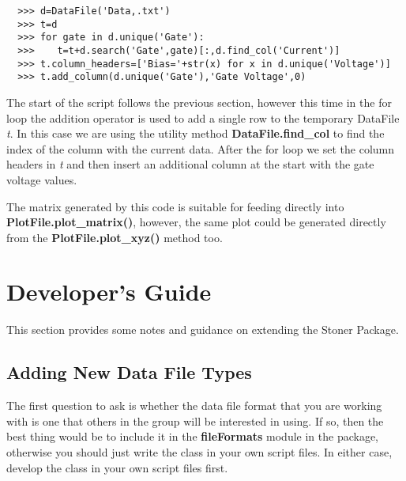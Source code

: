 \documentclass[a4paper,11pt]{scrartcl}
\begin{document}
\begin{verbatim}
  >>> d=DataFile('Data,.txt')
  >>> t=d
  >>> for gate in d.unique('Gate'):
  >>>    t=t+d.search('Gate',gate)[:,d.find_col('Current')]
  >>> t.column_headers=['Bias='+str(x) for x in d.unique('Voltage')]
  >>> t.add_column(d.unique('Gate'),'Gate Voltage',0)
\end{verbatim}

The start of the script follows the previous section, however this time in the
for loop the addition operator is used to add a single row to the temporary
DataFile \textit{t}. In this case we are using the utility method
\textbf{DataFile.find\_col} to find the index of the column with the current
data. After the for loop we set the column headers in \textit{t} and then insert
an additional column at the start with the gate voltage values.

The matrix generated by this code is suitable for feeding directly into \textbf{PlotFile.\linebreak plot\_matrix()}, however, the same plot could be generated directly from the \linebreak\textbf{PlotFile.plot\_xyz()} method too.

\section{Developer's Guide}

This section provides some notes and guidance on extending the Stoner Package.

\subsection{Adding New Data File Types}

The first question to ask is whether the data file format that you are working with is one that others in the group will be interested in using. If so, then the best thing would be to include it in the \textbf{fileFormats} module in the package, otherwise you should just write the class in your own script files. In either case, develop the class in your own script files first.
\end{document}
